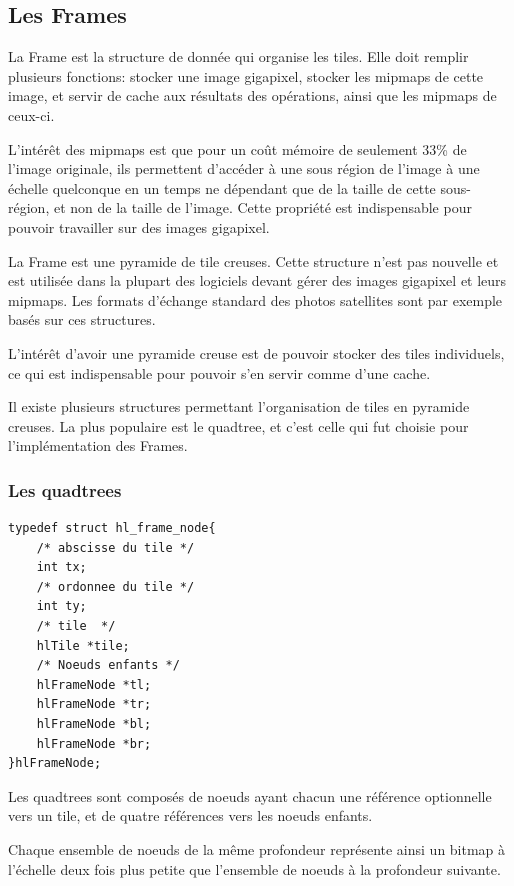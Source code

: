 		\subsection{Les Frames}
			La Frame est la structure de donnée qui organise les tiles. Elle doit remplir plusieurs fonctions: stocker une image gigapixel,
			stocker les mipmaps de cette image, et servir de cache aux résultats des opérations, ainsi que les mipmaps de ceux-ci.

			L'intérêt des mipmaps est que pour un coût mémoire de seulement 33\% de l'image originale, ils permettent d'accéder à une sous région
			de l'image à une échelle quelconque en un temps ne dépendant que de la taille de cette sous-région, et non de la taille de l'image. 
			Cette propriété est indispensable pour pouvoir travailler sur des images gigapixel.
			
			La Frame est une pyramide de tile creuses. Cette structure n'est pas nouvelle et est utilisée dans la plupart des logiciels devant
			gérer des images gigapixel et leurs mipmaps. Les formats d'échange standard des photos satellites sont par exemple basés sur ces structures.
			
			L'intérêt d'avoir une pyramide creuse est de pouvoir stocker des tiles individuels, ce qui est indispensable pour pouvoir s'en servir
			comme d'une cache.

			Il existe plusieurs structures permettant l'organisation de tiles en pyramide creuses. La plus populaire est le quadtree, et c'est celle
			qui fut choisie pour l'implémentation des Frames.

			\subsubsection{Les quadtrees}
		\begin{lstlisting}[float,caption={Définition des hlFrameNodes},frame=tb,label=lsthlFrameNode]
typedef struct hl_frame_node{
	/* abscisse du tile */
	int tx;
	/* ordonnee du tile */
	int ty;
	/* tile  */
	hlTile *tile;
	/* Noeuds enfants */
	hlFrameNode *tl;
	hlFrameNode *tr;
	hlFrameNode *bl;
	hlFrameNode *br;
}hlFrameNode;
		\end{lstlisting}
				Les quadtrees sont composés de noeuds ayant chacun une référence optionnelle vers un tile, et de quatre références vers
				les noeuds enfants. 

				Chaque ensemble de noeuds de la même profondeur représente ainsi un bitmap à l'échelle deux fois plus petite que l'ensemble de
				noeuds à la profondeur suivante.

